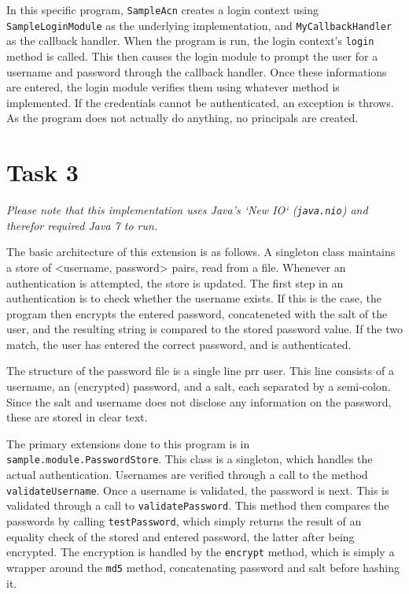 \documentclass{article}
\begin{document}
In this specific program, \texttt{SampleAcn} creates a login context using
\texttt{Sample\-Login\-Module} as the underlying implementation, and \texttt{MyCallbackHandler}
as the callback handler.
When the program is run, the login context's \texttt{login} method is called.
This then causes the login module to prompt the user for a username and password
through the callback handler.
Once these informations are entered, the login module verifies them using whatever
method is implemented.
If the credentials cannot be authenticated, an exception is throws.
As the program does not actually do anything, no principals are created.

\section{Task 3}
\emph{Please note that this implementation uses Java's `New IO` (\emph{\texttt{java.nio}}) 
and therefor required Java 7 to run.}

The basic architecture of this extension is as follows.
A singleton class maintains a store of <username, password> pairs, read from a file.
Whenever an authentication is attempted, the store is updated.
The first step in an authentication is to check whether the username exists.
If this is the case, the program then encrypts the entered password, concateneted
with the salt of the user, and the resulting string is compared to the stored password value.
If the two match, the user has entered the correct password, and is authenticated.

The structure of the password file is a single line prr user.
This line consists of a username, an (encrypted) password, and a salt, each separated by a semi-colon.
Since the salt and username does not disclose any information on the password, 
these are stored in clear text.

The primary extensions done to this program is in \texttt{sample.module.\-Password\-Store}.
This class is a singleton, which handles the actual authentication.
Usernames are verified through a call to the method \texttt{validateUsername}.
Once a username is validated, the password is next.
This is validated through a call to \texttt{validatePassword}.
This method then compares the passwords by calling \texttt{testPassword},
which simply returns the result of an equality check of the stored and entered password,
the latter after being encrypted.
The encryption is handled by the \texttt{encrypt} method, which is simply a wrapper around 
the \texttt{md5} method, concatenating password and salt before hashing it.
\end{document}
